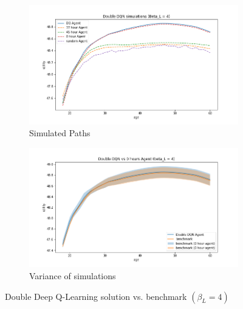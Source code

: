 \begin{figure}[ht]
\begin{subfigure}{.5\textwidth}
  \centering
  \includegraphics[width=1\linewidth]{figures/ddqn_model1_beta_4_solution_benchmark_paths.png}
  \caption{Simulated Paths}
  \label{fig:ddqn_solution_beta4_path}
\end{subfigure}%
\begin{subfigure}{.5\textwidth}
  \centering
  \includegraphics[width=1\linewidth]{figures/ddqn_model1_beta_4_solution_benchmark_variance.png}
  \caption{Variance of simulations}
  \label{fig:dqn_solution_beta4_var}
\end{subfigure}
    \caption{Double Deep Q-Learning solution vs. benchmark $(\beta_L = 4)$}
    \label{fig:ddqn_solution_beta4}
\end{figure}
